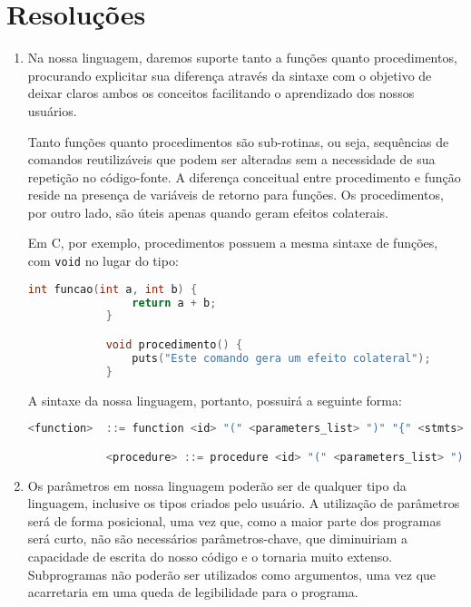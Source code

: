\documentclass[12pt, a4paper]{article}
\begin{document}
\section{Resoluções}
    \begin{enumerate}
        \item
        Na nossa linguagem, daremos suporte tanto a funções quanto
        procedimentos, procurando explicitar sua diferença através da sintaxe
        com o objetivo de deixar claros ambos os conceitos facilitando o
        aprendizado dos nossos usuários.

        Tanto funções quanto procedimentos são sub-rotinas, ou seja, sequências
        de comandos reutilizáveis que podem ser alteradas sem a necessidade de
        sua repetição no código-fonte. A diferença conceitual entre
        procedimento e função reside na presença de variáveis de retorno para
        funções. Os procedimentos, por outro lado, são úteis apenas quando
        geram efeitos colaterais.

        Em C, por exemplo, procedimentos possuem a mesma sintaxe de funções,
        com \texttt{void} no lugar do tipo:

        \begin{lstlisting}[language=C]
            int funcao(int a, int b) {
                return a + b;
            }

            void procedimento() {
                puts("Este comando gera um efeito colateral");
            }
        \end{lstlisting}

        A sintaxe da nossa linguagem, portanto, possuirá a seguinte forma:

        \begin{lstlisting}[language=C]
            <function>  ::= function <id> "(" <parameters_list> ")" "{" <stmts> <return_stmt> "}"

            <procedure> ::= procedure <id> "(" <parameters_list> ")" "{" <stmts> "}"
        \end{lstlisting}

        \item
        Os parâmetros em nossa linguagem poderão ser de qualquer tipo da
        linguagem, inclusive os tipos criados pelo usuário. A utilização de
        parâmetros será de forma posicional, uma vez que, como a maior parte
        dos programas será curto, não são necessários parâmetros-chave, que
        diminuiriam a capacidade de escrita do nosso código e o tornaria muito
        extenso. Subprogramas não poderão ser utilizados como argumentos, uma
        vez que acarretaria em uma queda de legibilidade para o programa.


\end{enumerate}
\end{document}

